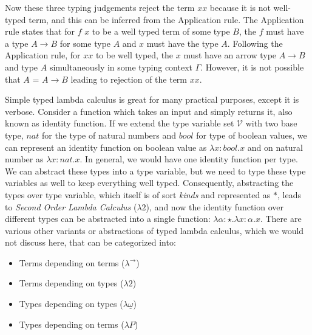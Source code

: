 \noindent
Now these three typing judgements  reject the term $x x$ because it is not well-typed term, and this can be 
inferred from the Application rule. 
The Application rule states that for $f$ $x$ to be a well typed term of some type $B$, the $f$ must have 
a type $A \rightarrow B$ for some type $A$ and $x$ must have the type $A$. Following the 
Application rule, for $x x$ to be well typed, the $x$ must have an arrow type $A \rightarrow B$
and type $A$ simultaneously in some typing context $\Gamma$. However, it is not possible that $A$ = $A \rightarrow B$
leading to rejection of the term $x x$. 

Simple typed lambda calculus is great for many practical purposes, except it is verbose. Consider a function 
which takes an input and simply returns it, also known as identity function.  If we extend the  
type variable set $\mathcal{V}$ with two base type,  $nat$ for the type of natural numbers 
and $bool$ for type of boolean values,  we can represent an
 identity function on boolean value as $\lambda x : bool. x$ and on natural number as 
 $\lambda x : nat. x$.   In general, we would have one identity function per type.  We can 
 abstract these types into a type variable,  but we need to type these type variables as well
 to keep everything well typed.  Consequently, abstracting the 
 types over type variable, which itself is of sort \textit{kinds} and represented as $*$, 
 leads to \textit{Second Order Lambda Calculus} ($\lambda2$),  and 
 now the identity function over different types can be abstracted into a single function:
 $\lambda \alpha : \star. \lambda x : \alpha. x$.
 There are various other variants or abstractions 
 of typed lambda calculus, which we would not discuss here, that can be categorized into:
 \begin{itemize}
 \item Terms depending on terms ($\lambda^{\to}$)
 \item Terms depending on types  ($\lambda2$)
 \item Types depending on types  ($\lambda {\underline{\omega}}$)
 \item Types depending on terms  ($\lambda P$)
 \end{itemize}



